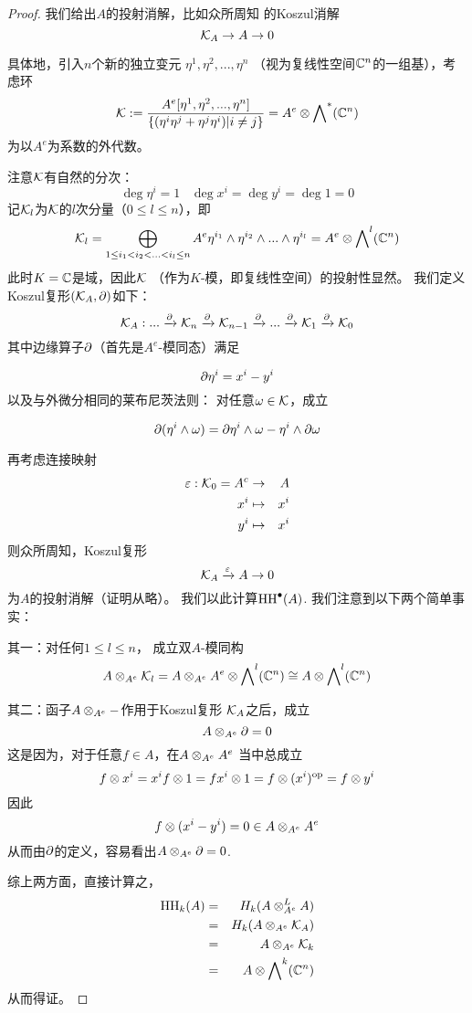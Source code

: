 \begin{proof}

我们给出$A$的投射消解，比如众所周知
的Koszul消解$$\mathcal{K}_A\to A\to 0$$

具体地，引入$n$个新的独立变元
$\eta^1,\eta^2,...,\eta^n$
（视为复线性空间$\mathbb{C}^n$的一组基），考虑环
$$\mathcal{K}:=\frac{A^e[\eta^1,\eta^2,...,\eta^n]}
               {\{(\eta^i\eta^j+\eta^j\eta^i)|i\neq j\}}
         =A^e\otimes\bigwedge\nolimits^ *(\mathbb{C}^n)$$
为以$A^e$为系数的外代数。

注意$\mathcal{K}$有自然的分次：
$$\deg\eta^i=1\,\,\,\,\,\deg x^i=\deg y^i=\deg 1=0$$
记$\mathcal{K}_l$为$\mathcal{K}$的$l$次分量（$0\leq l\leq n$），即
$$
\mathcal{K}_l=\bigoplus_{1\leq {i_1}<{i_2}<...<{i_l}\leq n}
          A^e\eta^{i_1}\wedge\eta^{i_2}\wedge...\wedge\eta^{i_l}
        =A^e\otimes\bigwedge\nolimits^ l(\mathbb{C}^n)$$
此时$K=\mathbb{C}$是域，因此$\mathcal{K}$
（作为$K$-模，即复线性空间）的投射性显然。
我们定义Koszul复形$(\mathcal{K}_A,\partial)$如下：
$$\mathcal{K}_A:...\xrightarrow{\partial} \mathcal{K}_n\xrightarrow{\partial}\mathcal{K}_{n-1}
\xrightarrow{\partial}...\xrightarrow{\partial}\mathcal{K}_1\xrightarrow{\partial}\mathcal{K}_0$$
其中边缘算子$\partial$（首先是$A^e$-模同态）满足

$$\partial\eta^i= x^i-y^i$$
以及与外微分相同的莱布尼茨法则：
对任意$\omega\in\mathcal{K}$，成立

$$\partial(\eta^i\wedge\omega)=
\partial\eta^i\wedge\omega-\eta^i\wedge\partial\omega$$

再考虑连接映射
\begin{eqnarray*}
\varepsilon:\mathcal{K}_0=A^c&\to& A\\
x^i&\mapsto&x^i\\
y^i&\mapsto&x^i\\
\end{eqnarray*}
则众所周知，Koszul复形
$$\mathcal{K}_A\xrightarrow{\varepsilon} A\to 0$$
为$A$的投射消解（证明从略）。
我们以此计算$\operatorname{HH}^{\bullet}(A)$.
我们注意到以下两个简单事实：

其一：对任何$1\leq l\leq n$，
成立双$A$-模同构
$$A\otimes_{A^e}\mathcal{K}_l=
A\otimes_{A^e}A^e\otimes\bigwedge\nolimits^ l(\mathbb{C}^n)
\cong A\otimes\bigwedge\nolimits^ l(\mathbb{C}^n)$$

其二：函子$A\otimes_{A^e}-$作用于Koszul复形
$\mathcal{K}_A$之后，成立
$$A\otimes_{A^e}\partial=0$$
这是因为，对于任意$f\in A$，在$A\otimes_{A^e}A^e$
当中总成立
$$f\otimes x^i=x^if\otimes 1
=fx^i\otimes 1=f\otimes (x^i)^{\text{op}}=f\otimes y^i$$
因此
$$f\otimes(x^i-y^i)=0\in
A\otimes_{A^e}A^e$$
从而由$\partial$的定义，容易看出$A\otimes_{A^e}\partial=0$.\vs

综上两方面，直接计算之，
\begin{eqnarray*}
\operatorname{HH}_k(A)&=&H_k(A\otimes_{A^e}^LA)\\
&=&H_k(A\otimes_{A^e}\mathcal{K}_A)\\
&=&A\otimes_{A^e}\mathcal{K}_k\\
&=&A\otimes\bigwedge\nolimits^ k(\mathbb{C}^n)
\end{eqnarray*}
从而得证。
\end{proof}

